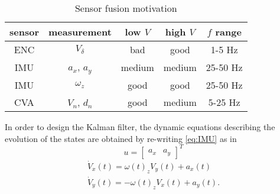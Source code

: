 \documentclass[letterpaper, 10 pt, conference]{ieeeconf}
\begin{document}
\begin{table}[h]
\caption{Sensor fusion motivation}
\label{tab:fusion}
\begin{center}
\begin{tabular}{|c|c|c|c|c|}
\hline
sensor & measurement & low $V$ & high $V$ & $f$ range \\
\hline
ENC & $V_\delta$ & bad & good & 1-5 Hz \\
\hline
IMU & $a_x$, $a_y$ & medium & medium & 25-50 Hz  \\
\hline
IMU & $\omega_z$ & good & good & 25-50 Hz \\
\hline
CVA & $V_n$, $d_{n}$ & good & medium & 5-25 Hz  \\
\hline
\end{tabular}
\end{center}
\end{table}

In order to design the Kalman filter, the dynamic equations describing the evolution of the states are  obtained by re-writing  \eqref{eq:IMU} as in
\begin{equation}\label{eq:u}
u = {\left[ {\begin{array}{*{20}{c}}{{a_x}}&{{a_y}}\end{array}} \right]^T}
\end{equation}	
\begin{equation}
\begin{array}{l}
{\dot V_x}\left( t \right) = \omega {\left( t \right)_z}{V_y}\left( t \right) + {a_x}\left( t \right) \\
{\dot V_y}\left( t \right) = - \omega {\left( t \right)_z}{V_x}\left( t \right) + {a_y}\left( t \right).
\end{array}	
\label{eq:AB}
\end{equation}
\end{document}
